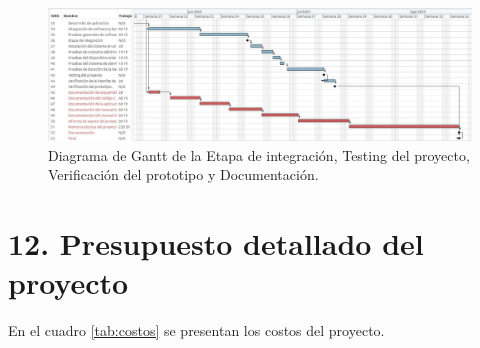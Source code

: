 \documentclass[
11pt, %
]{charter}
\begin{document}
\begin{figure}[htpb]
\centering 
\includegraphics[width=1.0\textwidth, height=.43 \textwidth]{./Figuras/ganttProyecto3.pdf}
\caption{Diagrama de Gantt de la Etapa de integración, Testing del proyecto, Verificación del prototipo y Documentación.}
\label{fig:gantt3}
\end{figure}



\section{12. Presupuesto detallado del proyecto}
\label{sec:presupuesto}



En el cuadro \ref{tab:costos} se presentan los costos del proyecto. 
\end{document}
